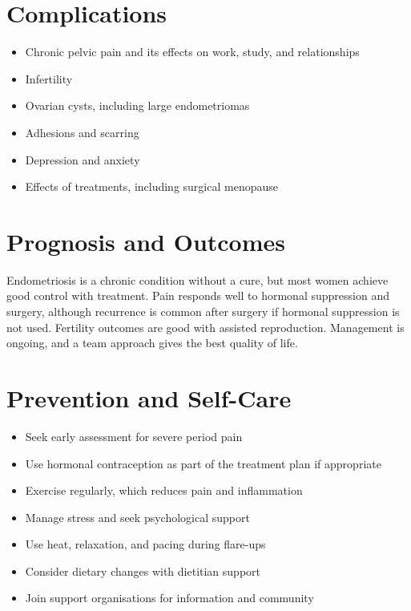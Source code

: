 \section*{Complications}
\begin{itemize}
    \item Chronic pelvic pain and its effects on work, study, and relationships
    \item Infertility
    \item Ovarian cysts, including large endometriomas
    \item Adhesions and scarring
    \item Depression and anxiety
    \item Effects of treatments, including surgical menopause
\end{itemize}

\section*{Prognosis and Outcomes}
Endometriosis is a chronic condition without a cure, but most women achieve good control with treatment. Pain responds well to hormonal suppression and surgery, although recurrence is common after surgery if hormonal suppression is not used. Fertility outcomes are good with assisted reproduction. Management is ongoing, and a team approach gives the best quality of life.

\section*{Prevention and Self-Care}
\begin{itemize}
    \item Seek early assessment for severe period pain
    \item Use hormonal contraception as part of the treatment plan if appropriate
    \item Exercise regularly, which reduces pain and inflammation
    \item Manage stress and seek psychological support
    \item Use heat, relaxation, and pacing during flare-ups
    \item Consider dietary changes with dietitian support
    \item Join support organisations for information and community
\end{itemize}

